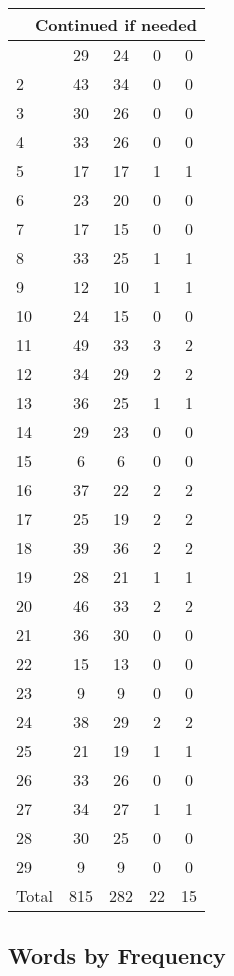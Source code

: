 \begin{center}
\begin{longtable}{l|c|c|c|c}
\hline \multicolumn{5}{|r|}{{Continued if needed}} \\ \hline
\endfoot 
1 & 29 & 24 & 0 & 0\\ \hline
2 & 43 & 34 & 0 & 0\\ \hline
3 & 30 & 26 & 0 & 0\\ \hline
4 & 33 & 26 & 0 & 0\\ \hline
5 & 17 & 17 & 1 & 1\\ \hline
6 & 23 & 20 & 0 & 0\\ \hline
7 & 17 & 15 & 0 & 0\\ \hline
8 & 33 & 25 & 1 & 1\\ \hline
9 & 12 & 10 & 1 & 1\\ \hline
10 & 24 & 15 & 0 & 0\\ \hline
11 & 49 & 33 & 3 & 2\\ \hline
12 & 34 & 29 & 2 & 2\\ \hline
13 & 36 & 25 & 1 & 1\\ \hline
14 & 29 & 23 & 0 & 0\\ \hline
15 & 6 & 6 & 0 & 0\\ \hline
16 & 37 & 22 & 2 & 2\\ \hline
17 & 25 & 19 & 2 & 2\\ \hline
18 & 39 & 36 & 2 & 2\\ \hline
19 & 28 & 21 & 1 & 1\\ \hline
20 & 46 & 33 & 2 & 2\\ \hline
21 & 36 & 30 & 0 & 0\\ \hline
22 & 15 & 13 & 0 & 0\\ \hline
23 & 9 & 9 & 0 & 0\\ \hline
24 & 38 & 29 & 2 & 2\\ \hline
25 & 21 & 19 & 1 & 1\\ \hline
26 & 33 & 26 & 0 & 0\\ \hline
27 & 34 & 27 & 1 & 1\\ \hline
28 & 30 & 25 & 0 & 0\\ \hline
29 & 9 & 9 & 0 & 0\\ \hline
\hline \hline
Total & 815 & 282 & 22 & 15



\end{longtable}
\end{center}

 
\subsection{Words by Frequency}
 
